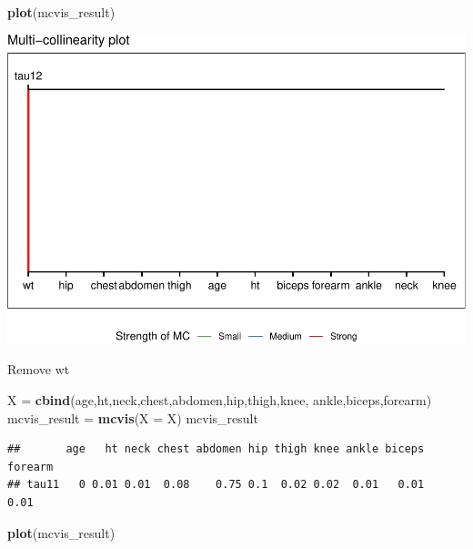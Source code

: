 \documentclass[]{article}
\newenvironment{Shaded}{\begin{snugshade}}{\end{snugshade}}
\newcommand{\KeywordTok}[1]{\textcolor[rgb]{0.13,0.29,0.53}{\textbf{#1}}}
\newcommand{\DataTypeTok}[1]{\textcolor[rgb]{0.13,0.29,0.53}{#1}}
\newcommand{\StringTok}[1]{\textcolor[rgb]{0.31,0.60,0.02}{#1}}
\newcommand{\NormalTok}[1]{#1}
\begin{document}
\begin{Shaded}
\begin{Highlighting}[]
\KeywordTok{plot}\NormalTok{(mcvis_result)}
\end{Highlighting}
\end{Shaded}

\includegraphics{BodyFat_files/figure-latex/unnamed-chunk-45-1.pdf}

Remove wt

\begin{Shaded}
\begin{Highlighting}[]
\NormalTok{X =}\StringTok{ }\KeywordTok{cbind}\NormalTok{(age,ht,neck,chest,abdomen,hip,thigh,knee,}
\NormalTok{         ankle,biceps,forearm)}
\NormalTok{mcvis_result =}\StringTok{ }\KeywordTok{mcvis}\NormalTok{(}\DataTypeTok{X =}\NormalTok{ X)}
\NormalTok{mcvis_result}
\end{Highlighting}
\end{Shaded}

\begin{verbatim}
##       age   ht neck chest abdomen hip thigh knee ankle biceps forearm
## tau11   0 0.01 0.01  0.08    0.75 0.1  0.02 0.02  0.01   0.01    0.01
\end{verbatim}

\begin{Shaded}
\begin{Highlighting}[]
\KeywordTok{plot}\NormalTok{(mcvis_result)}
\end{Highlighting}
\end{Shaded}
\end{document}

